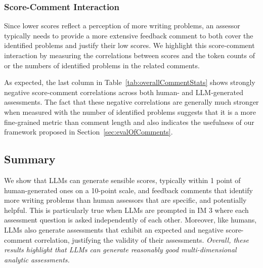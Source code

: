 \subsubsection{Score-Comment Interaction} 

Since lower scores reflect a perception of more writing problems, an assessor typically needs to provide a more extensive feedback comment to both cover the identified problems and justify their low scores. We highlight this score-comment interaction by measuring the correlations between scores and the token counts of or the numbers of identified problems in the related comments. 

As expected, the last column in Table~\ref{tab:overallCommentStats} shows strongly negative score-comment correlations across both human- and LLM-generated assessments. The fact that these negative correlations are generally much stronger when measured with the number of identified problems suggests that it is a more fine-grained metric than comment length and also indicates the usefulness of our framework proposed in Section~\ref{sec:evalOfComments}. 
 


\subsection{Summary}

We show that LLMs can generate sensible scores, typically within 1 point of human-generated ones on a 10-point scale, and feedback comments that identify more writing problems than human assessors that are specific, and potentially helpful. This is particularly true when LLMs are prompted in IM 3 where each assessment question is asked independently of each other. Moreover, like humans, LLMs also generate assessments that exhibit an expected and negative score-comment correlation, justifying the validity of their assessments. \textit{Overall, these results highlight that LLMs can generate reasonably good multi-dimensional analytic assessments.} 

